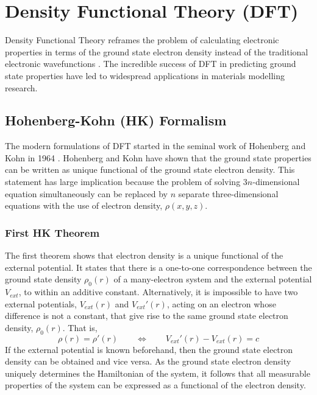 \section{Density Functional Theory (DFT)}
Density Functional Theory reframes the problem of calculating electronic properties in terms of the ground state electron density instead of the traditional electronic wavefunctions \citep{Kohn1999}. The incredible success of DFT in predicting ground state properties have led to widespread applications in materials modelling research. 

    
 \subsection{Hohenberg-Kohn (HK) Formalism}
 The modern formulations of DFT started in the seminal work of Hohenberg and Kohn in 1964 \citep{Hohenberg1964}. Hohenberg and Kohn have shown that the ground state properties can be written as unique functional of the ground state electron density. This statement has large implication because the problem of solving 3$n$-dimensional equation simultaneously can be replaced by $n$ separate three-dimensional equations with the use of electron density, $\rho(x,y,z)$. 
    \subsubsection{First HK Theorem}
    The first theorem shows that electron density is a unique functional of the external potential. It states that there is a one-to-one correspondence between the ground state density $\rho_0(r)$ of a many-electron system and the external potential $V_{ext}$, to within an additive constant. Alternatively, it is impossible to have two external potentials, $V_{ext}(r)$ and $V_{ext}'(r)$, acting on an electron whose difference is not a constant, that give rise to the same ground    state electron density, $\rho_0(r)$. That is,  
\begin{equation}
    \rho(r) = \rho'(r) \quad \quad \Longleftrightarrow \quad \quad V_{ext}'(r) - V_{ext}(r) = c
\end{equation}
If the external potential is known beforehand, then the ground state electron density can be obtained and vice versa. As the ground state electron density uniquely determines the Hamiltonian of the system, it follows that all measurable properties of the system can be expressed as a functional of the electron density. 

